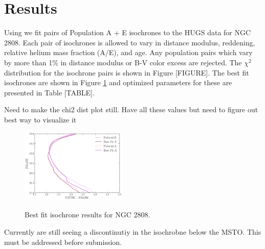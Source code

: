 \section{Results}\label{sec:results}
Using \fidanka we fit pairs of Population A + E isochrones to the HUGS data for
NGC 2808. Each pair of isochrones is allowed to vary in distance modulus,
reddening, relative helium mass fraction (A/E), and age. Any population pairs which vary by more than 1\% in distance modulus or B-V color excess are rejected. The $\chi^{2}$
distribution for the isochrone pairs is shown in Figure {\color{red}[FIGURE]}.
The best fit isochrones are shown in Figure \ref{fig:BestFitResults} and optimized
parameters for these are presented in Table {\color{red}[TABLE]}.

{\color{red} Need to make the chi2 dist plot still. Have all these values but need to figure out best way to visualize it}

\begin{figure}
  \centering
  \includegraphics[width=0.45\textwidth]{src/figures/BestFit.png}
  \label{fig:BestFitResults}
  \caption{Best fit isochrone results for NGC 2808.}
\end{figure}

{\color{blue} Currently are still seeing a discontinutiy in the isochrobne below the MSTO. This must be addressed before submission.}
